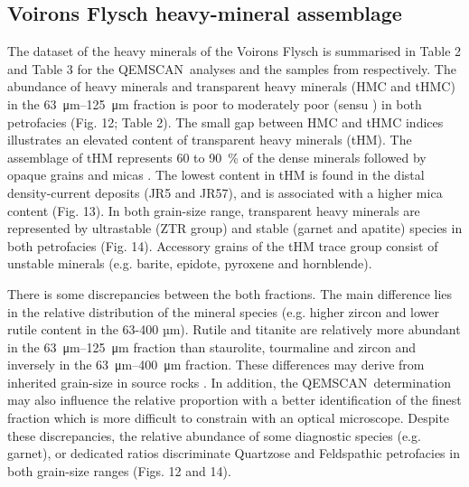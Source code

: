 \documentclass[twoside]{article}
\newcommand\registred{\textsuperscript{\tiny\textregistered}}
\begin{document}
\subsection{Voirons Flysch heavy-mineral assemblage}

The dataset of the heavy minerals of the Voirons Flysch is summarised in Table 2 and Table 3 for the QEMSCAN\registred\ analyses and the samples from \cite{Ragusa2009} respectively. The abundance of heavy minerals and transparent heavy minerals (HMC and tHMC) in the \SIrange{63}{125}{\micro\meter} fraction is poor to moderately poor (sensu \citealp{Garzanti2010}) in both petrofacies (Fig. 12; Table 2). The small gap between HMC and tHMC indices illustrates an elevated content of transparent heavy minerals (tHM). The assemblage of tHM represents 60 to 90~\% of the dense minerals followed by opaque grains and micas \citep{Ragusa2015}. The lowest content in tHM is found in the distal density-current deposits (JR5 and JR57), and is associated with a higher mica content (Fig. 13). In both grain-size range, transparent heavy minerals are represented by ultrastable (ZTR group) and stable (garnet and apatite) species in both petrofacies (Fig. 14). Accessory grains of the tHM trace group consist of unstable minerals (e.g. barite, epidote, pyroxene and hornblende).\par
There is some discrepancies between the both fractions. The main difference lies in the relative distribution of the mineral species (e.g. higher zircon and lower rutile content in the 63-400 µm). Rutile and titanite are relatively more abundant in the \SIrange{63}{125}{\micro\meter} fraction than staurolite, tourmaline and zircon and inversely in the \SIrange{63}{400}{\micro\meter} fraction. These differences may derive from inherited grain-size in source rocks \citep{Morton1999}. In addition, the QEMSCAN\registred\ determination may also influence the relative proportion with a better identification of the finest fraction which is more difficult to constrain with an optical microscope. Despite these discrepancies, the relative abundance of some diagnostic species (e.g. garnet), or dedicated ratios discriminate Quartzose and Feldspathic petrofacies in both grain-size ranges (Figs. 12 and 14).
\end{document}
